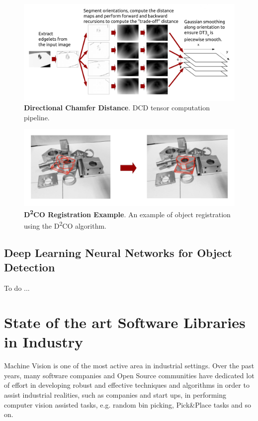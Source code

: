 \begin{figure}
    \centering
    \includegraphics[width=\textwidth]{figures/1_perception_and_sensing_in_robotics/d2co_01}
    \caption{\textbf{Directional Chamfer Distance}. DCD tensor computation pipeline.} 
    \label{fig:d2co_01}
\end{figure}

\begin{figure}
    \centering
    \includegraphics[width=\textwidth]{figures/1_perception_and_sensing_in_robotics/d2co_02}
    \caption{\textbf{D\textsuperscript{2}{CO} Registration Example}. An example of object registration using the D\textsuperscript{2}{CO} algorithm.} 
    \label{fig:d2co_02}
\end{figure}

\subsection{Deep Learning Neural Networks for Object Detection}\label{subsec:dl_obj_detection}
To do ...

\section{State of the art Software Libraries in Industry}\label{sec:industrylibraries}
Machine Vision is one of the most active area in industrial settings. Over the past years, many software companies and Open Source communities have dedicated lot of effort in developing robust and effective techniques and algorithms in order to assist industrial realities, such as companies and start ups, in performing computer vision assisted tasks, e.g. random bin picking, Pick\&Place tasks and so on.

